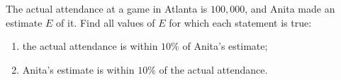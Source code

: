 The actual attendance at a game in Atlanta is $100{,}000$, and Anita made an estimate $E$ of it. Find all values of $E$ for which each statement is true:
\begin{enumerate}
\item[(i)] the actual attendance is within $10\%$ of Anita's estimate;
\item[(ii)] Anita's estimate is within $10\%$ of the actual attendance.
\end{enumerate}
